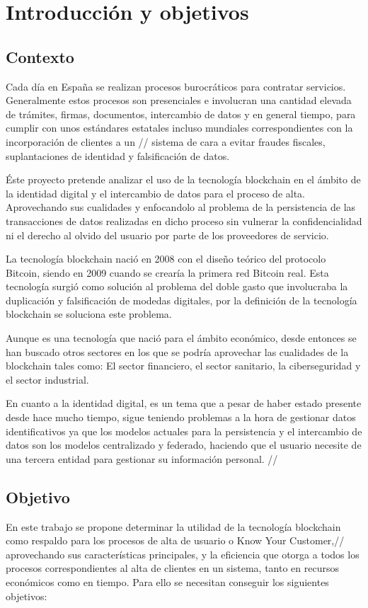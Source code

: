 \documentclass[12pt]{report}
\author{Autor: Christian Karem Taidi Santana}
\date{17 Junio 2020}
\begin{document}

\tableofcontents
\listoffigures




\chapter{Introducción y objetivos}
\section{Contexto}
Cada día en España se realizan procesos burocráticos para contratar servicios. Generalmente estos procesos son presenciales e involucran una cantidad elevada de trámites, firmas, documentos, intercambio de datos y en general tiempo, para cumplir con unos estándares estatales incluso mundiales correspondientes con la incorporación de clientes a un // sistema de cara a evitar fraudes fiscales, suplantaciones de identidad y falsificación de datos.

Éste proyecto pretende analizar el uso de la tecnología blockchain en el ámbito de la identidad digital y el intercambio de datos para el proceso de alta. Aprovechando sus cualidades y enfocandolo al problema de la persistencia de las transacciones de datos realizadas en dicho proceso sin vulnerar la confidencialidad ni el derecho al olvido del usuario por parte de los proveedores de servicio.

La tecnología blockchain nació en 2008 con el diseño teórico del protocolo Bitcoin, siendo en 2009 cuando se crearía la primera red Bitcoin real. Esta tecnología surgió como solución al problema del doble gasto que involucraba la duplicación y falsificación de modedas digitales, por la definición de la tecnología blockchain se soluciona este problema.

Aunque es una tecnología que nació para el ámbito económico, desde entonces se han buscado otros sectores en los que se podría aprovechar las cualidades de la blockchain tales como: El sector financiero, el sector sanitario, la ciberseguridad y el sector industrial.

En cuanto a la identidad digital, es un tema que a pesar de haber estado presente desde hace mucho tiempo, sigue teniendo problemas a la hora de gestionar datos identificativos ya que los modelos actuales para la persistencia y el intercambio de datos son los modelos centralizado y federado, haciendo que el usuario necesite de una tercera entidad para gestionar su información personal.
//
\section{Objetivo}
En este trabajo se propone determinar la utilidad de la tecnología blockchain como respaldo para los procesos de alta de usuario o Know Your Customer,// aprovechando sus características principales, y la eficiencia que otorga a todos los procesos correspondientes al alta de clientes en un sistema, tanto en recursos económicos como en tiempo. Para ello se necesitan conseguir los siguientes objetivos:
\end{document}

